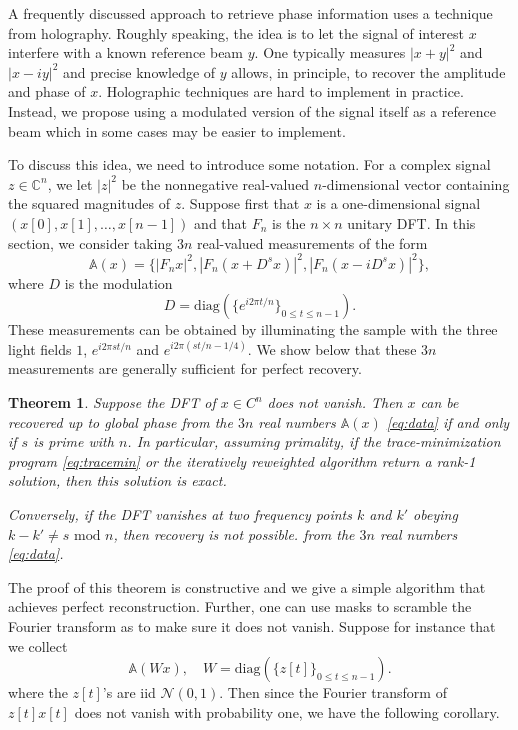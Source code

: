 \documentclass[11pt]{article}
\newtheorem{theorem}{Theorem}[section]
\newcommand{\C}{\mathbb{C}}
\newcommand{\<}{\langle}
\renewcommand{\>}{\rangle}
\newcommand{\mapA}{\mathbb{A}}
\numberwithin{equation}{section}
\begin{document}
A frequently discussed approach to retrieve phase information uses a
technique from holography. Roughly speaking, the idea is to let the
signal of interest $x$ interfere with a known reference beam $y$. One
typically measures $|x + y|^2$ and $|x - iy|^2$ and precise knowledge
of $y$ allows, in principle, to recover the amplitude and phase of
$x$. Holographic techniques are hard to implement \cite{Dua11} in
practice. Instead, we propose using a modulated version of the signal
itself as a reference beam which in some cases may be easier to
implement.

To discuss this idea, we need to introduce some notation. For a
complex signal $z \in \C^n$, we let $|z|^2$ be the nonnegative
real-valued $n$-dimensional vector containing the squared magnitudes
of $z$.  Suppose first that $x$ is a one-dimensional signal $(x[0],
x[1], \ldots, x[n-1])$ and that $F_n$ is the $n \times n$ unitary
DFT. In this section, we consider taking $3n$ real-valued measurements
of the form
\begin{equation}
  \label{eq:data}
  \mapA(x) = \{|F_n x|^2, |F_n (x + D^s x)|^2, |F_n(x - iD^s x)|^2\}, 
\end{equation}
where $D$ is the modulation 
\[
D = \text{diag}(\{e^{i2\pi t/n}\}_{0 \le t \le n-1}).
\]
These measurements can be obtained by illuminating the sample with the
three light fields $1$, $e^{i2\pi st/n}$ and $e^{i2\pi (st/n -
  1/4)}$. We show below that these $3n$ measurements are generally
sufficient for perfect recovery.

\begin{theorem}
\label{teo:1D}
Suppose the DFT of $x \in C^n$ does not vanish. Then $x$ can be
recovered up to global phase from the $3n$ real numbers $\mapA(x)$
\eqref{eq:data} if and only if $s$ is prime with $n$. In particular,
assuming primality, if the trace-minimization program
\eqref{eq:tracemin} or the iteratively reweighted algorithm return a
rank-1 solution, then this solution is exact.

Conversely, if the DFT vanishes at two frequency points $k$ and $k'$
obeying $k - k' \neq s \text{ mod } n$, then recovery is not possible.
from the $3n$ real numbers \eqref{eq:data}.
\end{theorem}
The proof of this theorem is constructive and we give a simple
algorithm that achieves perfect reconstruction. Further, one can use
masks to scramble the Fourier transform as to make sure it does not
vanish. Suppose for instance that we collect
\[
\mapA(Wx), \quad W = \text{diag}(\{z[t]\}_{0 \le t \le n-1}).
\]
where the $z[t]$'s are iid $\mathcal{N}(0,1)$. Then since the Fourier
transform of $z[t] x[t]$ does not vanish with probability one, we have
the following corollary. 
\end{document}
